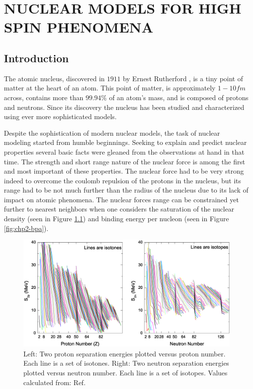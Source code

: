 %
%

\chapter{NUCLEAR MODELS FOR HIGH SPIN PHENOMENA}
\label{chp:models}

\section{Introduction}
\label{sec:models-into}
The atomic nucleus, discovered in $1911$ by Ernest Rutherford \cite{rutherfordNuclearModel}, is a tiny point of matter at the heart of an atom. This point of matter, is approximately $1-10fm$ across, contains more than $99.94\%$ of an atom's mass, and is composed of protons and neutrons. Since its discovery the nucleus has been studied and characterized using ever more sophisticated models.

Despite the sophistication of modern nuclear models, the task of nuclear modeling started from humble beginnings. Seeking to explain and predict nuclear properties several basic facts were gleaned from the observations at hand in that time. The strength and short range nature of the nuclear force is among the first and most important of these properties. The nuclear force had to be very strong indeed to overcome the coulomb repulsion of the protons in the nucleus, but its range had to be not much further than the radius of the nucleus due to its lack of impact on atomic phenomena. The nuclear forces range can be constrained yet further to nearest neighbors when one considers the saturation of the nuclear density (seen in Figure \ref{fig:chp2-density}) and binding energy per nucleon (seen in Figure \ref{fig:chp2-bpa}).

\begin{figure}
\label{fig:chp2-density}
\centerline{\includegraphics[width=\textwidth]{./img/c2/2nuc_sep_en.eps}}
	\caption{Left: Two proton separation energies plotted versus proton number. Each line is a set of isotones. Right: Two neutron separation energies plotted versus neutron number. Each line is a set of isotopes. Values calculated from: Ref.\cite{AME20031,AME20032}}
\end{figure}


